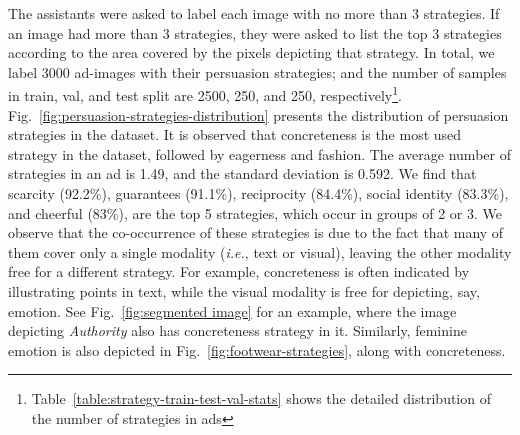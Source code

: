 The assistants were asked to label each image with no more than 3 strategies. If an image had more than 3 strategies, they were asked to list the top 3 strategies according to the area covered by the pixels depicting that strategy. In total, we label 3000 ad-images with their persuasion strategies; and the number of samples in train, val, and test split are 2500, 250, and 250, respectively\footnote{Table~\ref{table:strategy-train-test-val-stats} shows the detailed distribution of the number of strategies in ads}. Fig.~\ref{fig:persuasion-strategies-distribution} presents the distribution of persuasion strategies in the dataset. It is observed that concreteness is the most used strategy in the dataset, followed by eagerness and fashion. The average number of strategies in an ad is 1.49, and the standard deviation is 0.592. We find that scarcity (92.2\%), guarantees (91.1\%), reciprocity (84.4\%), social identity (83.3\%), and cheerful (83\%), %
are the top 5 strategies, which occur in groups of 2 or 3. We observe that the co-occurrence of these strategies is due to the fact that many of them cover only a single modality (\textit{i.e.}, text or visual), leaving the other modality free for a different strategy. For example, concreteness is often indicated by illustrating points in text, while the visual modality is free for depicting, say, emotion. See Fig.~\ref{fig:segmented image} for an example, where the image depicting \textit{Authority} also has concreteness strategy in it. Similarly, feminine emotion is also depicted in Fig.~\ref{fig:footwear-strategies}, along with concreteness.


